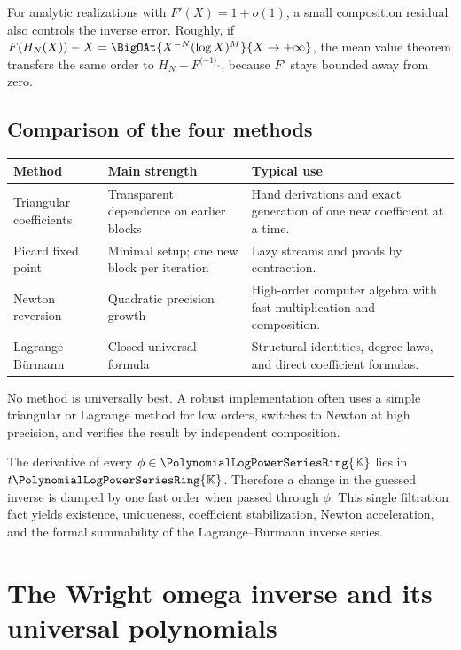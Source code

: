 \documentclass[11pt,oneside,openany]{book}
\newcommand{\K}{\mathbb{K}}
\newcommand{\Rring}{\PolynomialLogPowerSeriesRing{\K}}
\newcommand{\rev}{^{\langle-1\rangle_{\circ}}}
\begin{document}
For analytic realizations with \(F'(X)=1+o(1)\), a small composition residual
also controls the inverse error.  Roughly, if
\(F(H_N(X))-X=\BigOAt{X^{-N}(\log X)^M}{X\to+\infty}\), the mean value theorem transfers the
same order to \(H_N-F\rev\), because \(F'\) stays bounded away from zero.

\section{Comparison of the four methods}
\begin{center}
\begin{tabularx}{0.95\textwidth}{@{}>{\raggedright\arraybackslash}p{}>{\raggedright\arraybackslash}p{}X@{}}
\toprule
Method & Main strength & Typical use \\
\midrule
Triangular coefficients
& Transparent dependence on earlier blocks
& Hand derivations and exact generation of one new coefficient at a time. \\
Picard fixed point
& Minimal setup; one new block per iteration
& Lazy streams and proofs by contraction. \\
Newton reversion
& Quadratic precision growth
& High-order computer algebra with fast multiplication and composition. \\
Lagrange--Bürmann
& Closed universal formula
& Structural identities, degree laws, and direct coefficient formulas. \\
\bottomrule
\end{tabularx}
\end{center}

No method is universally best.  A robust implementation often uses a simple
triangular or Lagrange method for low orders, switches to Newton at high
precision, and verifies the result by independent composition.

\begin{summarybox}
The derivative of every \(\phi\in\Rring\) lies in \(t\Rring\).  Therefore a
change in the guessed inverse is damped by one fast order when passed through
\(\phi\).  This single filtration fact yields existence, uniqueness,
coefficient stabilization, Newton acceleration, and the formal summability of
the Lagrange--Bürmann inverse series.
\end{summarybox}


\chapter{The Wright omega inverse and its universal polynomials}
\label{ch:omega}
\end{document}
